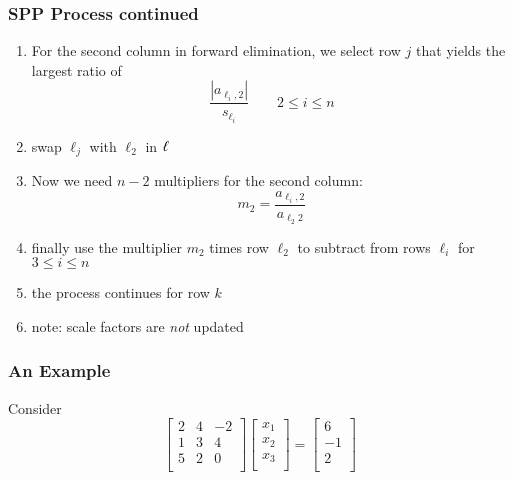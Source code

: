 \documentclass[10pt]{beamer}
\begin{document}
\begin{frame}
\frametitle{SPP Process continued}
\begin{enumerate}
  \item For the second column in forward elimination, we select row $j$
that yields the largest ratio of
  \begin{equation*}
    \frac{|a_{\ell_i,2}|}{s_{\ell_i}}\qquad 2\leq i\leq n
\end{equation*}

  \item swap $\ell_{j}$ with $\ell_{2}$ in ${\bf{\ell}}$

  \item Now we need $n-2$ multipliers for the second column:
  \begin{equation*}
    m_2 = \frac{a_{\ell_{i},2}}{a_{\ell_{2}2}}
\end{equation*}

  \item finally use the multiplier $m_2$ times row $\ell_2$ to subtract
from rows $\ell_i$ for $3 \leq i \leq n$

  \item the process continues for row $k$

  \item note: scale factors are \emph{not} updated
\end{enumerate}
\end{frame}
\begin{frame}
\frametitle{An Example}
Consider
\begin{equation*}
\begin{bmatrix}
  2 & 4 & -2\\
  1 & 3 & 4\\
  5 & 2 & 0\\
\end{bmatrix}
\begin{bmatrix}
  x_1\\
  x_2\\
  x_3\\
\end{bmatrix}
=
\begin{bmatrix}
  6\\
  -1\\
  2\\
\end{bmatrix}
\end{equation*}
\end{frame}
\end{document}
